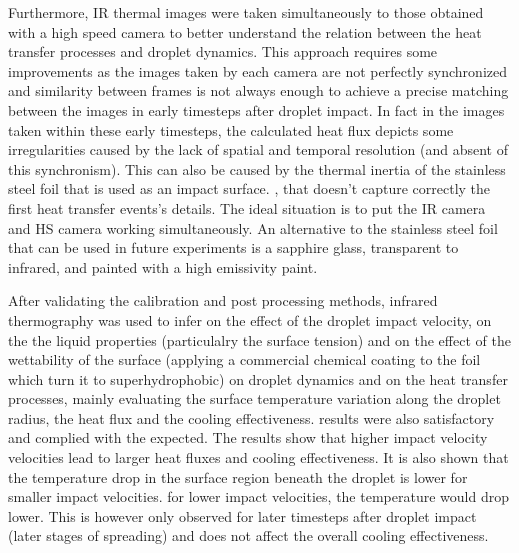 \par Furthermore, IR thermal images were taken simultaneously to those obtained with a high speed camera to better understand the relation between the heat transfer processes and droplet dynamics. This approach requires some improvements as the images taken by each camera are not perfectly synchronized and similarity between frames is not always enough to achieve a precise matching between the images in early timesteps after droplet impact. In fact in the images taken within these early timesteps, the calculated heat flux depicts some irregularities caused by the lack of spatial and temporal resolution (and absent of this synchronism). This can also be caused by the thermal inertia of the stainless steel foil that is used as an impact surface. , that doesn't capture correctly the first heat transfer events's details. The ideal situation is to put the IR camera and HS camera working simultaneously. An alternative to the stainless steel foil that can be used in future experiments is a sapphire glass, transparent to infrared, and painted with a high emissivity paint.\\
\par After validating the calibration and post processing methods, infrared thermography was used to infer on the effect of the droplet impact velocity, on the the liquid properties (particulalry the surface tension) and on the effect of the wettability of the surface (applying a commercial chemical coating to the foil which turn it to superhydrophobic) on droplet dynamics and on the heat transfer processes, mainly evaluating the surface temperature variation along the droplet radius, the heat flux and the cooling effectiveness.   results were also satisfactory and complied with the expected. The results show that higher impact velocity velocities lead to larger heat fluxes and cooling effectiveness. It is also shown that  the temperature drop in the surface region beneath the droplet is lower for smaller impact velocities. for lower impact velocities, the temperature would drop lower. This is however only observed for later timesteps after droplet impact (later stages of spreading) and does not affect the overall cooling effectiveness.\\
